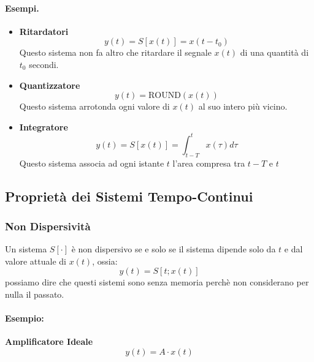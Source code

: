 \paragraph{Esempi. }
\begin{itemize}
    \item \textbf{Ritardatori}
    \begin{equation}
        y(t) = S[x(t)] = x(t - t_0)
    \end{equation}
    Questo sistema non fa altro che ritardare il segnale $x(t)$ di una quantità di $t_0$ secondi.

    \item \textbf{Quantizzatore}
    \begin{equation}
        y(t) = \mbox{ROUND}(x(t))
    \end{equation}
    Questo sistema arrotonda ogni valore di $x(t)$ al suo intero più vicino.

    \item \textbf{Integratore}
    \begin{equation}
        y(t) = S[x(t)] = \int_{t - T}^{t} x(\tau)d\tau
    \end{equation}
    Questo sistema associa ad ogni istante $t$ l'area compresa tra $t - T$ e $t$
\end{itemize}

\subsection{Proprietà dei Sistemi Tempo-Continui}
\subsubsection{Non Dispersività}
Un sistema $S[\cdot]$ è non dispersivo se e solo se il sistema dipende solo da $t$ e dal valore attuale di $x(t)$, ossia:
\begin{equation}
    y(t) = S[t; x(t)]
\end{equation}
possiamo dire che questi sistemi sono senza memoria perchè non considerano per nulla il passato.
\paragraph{Esempio:}
\textbf{Amplificatore Ideale}
\begin{equation}\label{eq: AmpId}
    y(t) = A \cdot x(t)
\end{equation}

